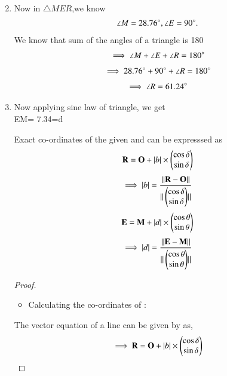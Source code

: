 \documentclass[journal,12pt,twocolumn]{IEEEtran}
\newcommand{\myvec}[1]{\ensuremath{\begin{pmatrix}#1\end{pmatrix}}}
\begin{document}
\begin{enumerate}
\begin{align}
\end{align}
\item Now in $\triangle MER$,we know
 \begin{align}
 \angle M=28.76\degree, \angle E=90\degree.
  \end{align}
  We know that sum of the angles of a triangle is 180\degree
 \begin{align}
     \implies \angle M+ \angle E+ \angle R= 180\degree
 \end{align}
 \begin{align}
     \implies 28.76\degree+90\degree+\angle R= 180\degree
 \end{align}
 \begin{align}
 \implies \angle R=61.24\degree
 \end{align}
 \item Now applying sine law of triangle, we get \\
 EM= 7.34=d \\
\begin{lemma}
Exact co-ordinates of the given  and  can be expresssed as
\begin{align}
 \vec{R}= \vec{O}+ \abs{b}\times \myvec{\cos\delta\\\sin\delta}
\end{align}
 \begin{align}
    \implies \abs{b}=\frac{{\norm{\vec{R}-\vec{O}}}}{{\norm{\myvec{\cos\delta\\\sin\delta}}}} 
\end{align}
 \begin{align}
 \vec{E}= \vec{M}+ \abs{d}\times \myvec{\cos\theta\\\sin\theta}
 \end{align}
  \begin{align}
     \implies \abs{d}= \frac{{\norm{\vec{E}-\vec{M}}}}{{\norm{\myvec{\cos\theta\\\sin\theta}}}}
 \end{align}
 \end{lemma}
 \begin{proof}
 \begin{itemize}
     \item Calculating the co-ordinates of :\\
 \end{itemize}
 The vector equation of a line can be given by as,
 \begin{align}
\implies \vec{R}= \vec{O}+\abs{b}\times \myvec{\cos\delta\\\sin\delta}

\end{align}
\end{proof}
\end{enumerate}
\end{document}
